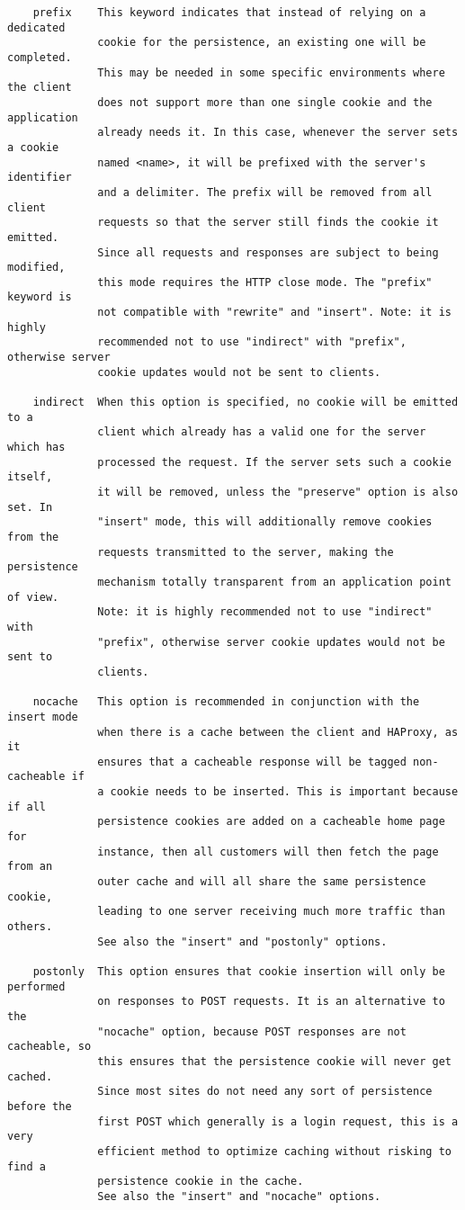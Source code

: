 \begin{verbatim}
    prefix    This keyword indicates that instead of relying on a dedicated
              cookie for the persistence, an existing one will be completed.
              This may be needed in some specific environments where the client
              does not support more than one single cookie and the application
              already needs it. In this case, whenever the server sets a cookie
              named <name>, it will be prefixed with the server's identifier
              and a delimiter. The prefix will be removed from all client
              requests so that the server still finds the cookie it emitted.
              Since all requests and responses are subject to being modified,
              this mode requires the HTTP close mode. The "prefix" keyword is
              not compatible with "rewrite" and "insert". Note: it is highly
              recommended not to use "indirect" with "prefix", otherwise server
              cookie updates would not be sent to clients.

    indirect  When this option is specified, no cookie will be emitted to a
              client which already has a valid one for the server which has
              processed the request. If the server sets such a cookie itself,
              it will be removed, unless the "preserve" option is also set. In
              "insert" mode, this will additionally remove cookies from the
              requests transmitted to the server, making the persistence
              mechanism totally transparent from an application point of view.
              Note: it is highly recommended not to use "indirect" with
              "prefix", otherwise server cookie updates would not be sent to
              clients.

    nocache   This option is recommended in conjunction with the insert mode
              when there is a cache between the client and HAProxy, as it
              ensures that a cacheable response will be tagged non-cacheable if
              a cookie needs to be inserted. This is important because if all
              persistence cookies are added on a cacheable home page for
              instance, then all customers will then fetch the page from an
              outer cache and will all share the same persistence cookie,
              leading to one server receiving much more traffic than others.
              See also the "insert" and "postonly" options.

    postonly  This option ensures that cookie insertion will only be performed
              on responses to POST requests. It is an alternative to the
              "nocache" option, because POST responses are not cacheable, so
              this ensures that the persistence cookie will never get cached.
              Since most sites do not need any sort of persistence before the
              first POST which generally is a login request, this is a very
              efficient method to optimize caching without risking to find a
              persistence cookie in the cache.
              See also the "insert" and "nocache" options.


\end{verbatim}
